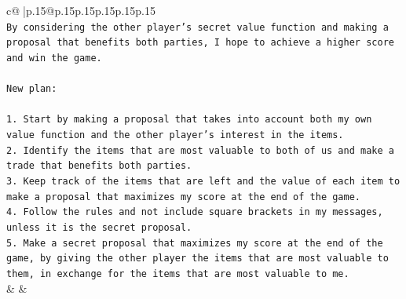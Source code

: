 \documentclass{article}
\begin{document}
{\begin{supertabular}{c@{$\;$}|p{.15\linewidth}@{}p{.15\linewidth}p{.15\linewidth}p{.15\linewidth}p{.15\linewidth}p{.15\linewidth}}
{{{\\ 
\texttt{By considering the other player's secret value function and making a proposal that benefits both parties, I hope to achieve a higher score and win the game.} \\
\\ 
\texttt{New plan: } \\
\\ 
\texttt{1. Start by making a proposal that takes into account both my own value function and the other player's interest in the items.} \\
\texttt{2. Identify the items that are most valuable to both of us and make a trade that benefits both parties.} \\
\texttt{3. Keep track of the items that are left and the value of each item to make a proposal that maximizes my score at the end of the game.} \\
\texttt{4. Follow the rules and not include square brackets in my messages, unless it is the secret proposal.} \\
\texttt{5. Make a secret proposal that maximizes my score at the end of the game, by giving the other player the items that are most valuable to them, in exchange for the items that are most valuable to me.} \\
            }
        }
    }
    & & \\ \\


\end{supertabular}}
\end{document}

